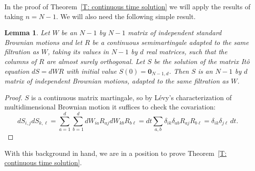 \documentclass[12pt]{article}
\newtheorem{lemma}{Lemma}
\newcommand{\1}{\mathbf{1}}
\begin{document}
{In the proof of Theorem~\ref{T: continuous time solution} we will apply the results of \cite{NRW} taking $n = N-1$. We will also need the following simple result.}

\begin{lemma}\label{L: rotating the driving motion}
Let $W$ be an $N-1$ by $N-1$ matrix of independent standard Brownian motions and let $R$ be a continuous semimartingale adapted to the same filtration as $W$, taking its values in $N-1$ by $d$ real matrices, such that the columns of $R$ are almost surely orthogonal. Let $S$ be the solution of the matrix It\^{o} equation $dS = dW R$ with initial value $S(0) = \mathbf{0}_{N-1,d}$. Then $S$ is an $N-1$ by $d$ matrix of independent Brownian motions, adapted to the same filtration as $W$. 
\end{lemma}
\begin{proof}
 $S$ is a continuous matrix martingale, so by L\'evy's characterization of multidimensional Brownian motion it suffices to check the covariation:
 $$dS_{i,j} dS_{k,\ell}   =  \sum_{a =1}^d\sum_{b = 1}^d dW_{ia} R_{aj} dW_{kb} R_{b\ell}
  =  dt \sum_{a,b} \delta_{ik} \delta_{ab} R_{aj} R_{b\ell} =  \delta_{ik} \delta_{j\ell}\,dt.$$

\end{proof}
With this background in hand, we are in a position to prove Theorem~\ref{T: continuous time solution}.
\end{document}
